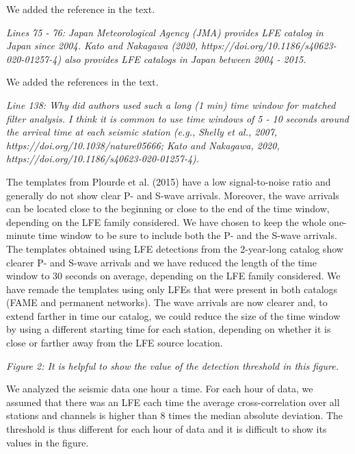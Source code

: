 \documentclass[letterpaper, 12pt]{article}
\begin{document}
\bigskip

We added the reference in the text.

\bigskip

\textit{Lines 75 - 76: Japan Meteorological Agency (JMA) provides LFE catalog in Japan since 2004. Kato and Nakagawa (2020, https://doi.org/10.1186/s40623-020-01257-4) also provides LFE catalogs in Japan between 2004 - 2015.}

\bigskip

We added the references in the text.

\bigskip

\textit{Line 138: Why did authors used such a long (1 min) time window for matched filter analysis. I think it is common to use time windows of 5 - 10 seconds around the arrival time at each seismic station (e.g., Shelly et al., 2007, https://doi.org/10.1038/nature05666; Kato and Nakagawa, 2020, https://doi.org/10.1186/s40623-020-01257-4).}

\bigskip

The templates from Plourde et al. (2015) have a low signal-to-noise ratio and generally do not show clear P- and S-wave arrivals. Moreover, the wave arrivals can be located close to the beginning or close to the end of the time window, depending on the LFE family considered. We have chosen to keep the whole one-minute time window to be sure to include both the P- and the S-wave arrivals. The templates obtained using LFE detections from the 2-year-long catalog show clearer P- and S-wave arrivals and we have reduced the length of the time window to 30 seconds on average, depending on the LFE family considered. We have remade the templates using only LFEs that were present in both catalogs (FAME and permanent networks). The wave arrivals are now clearer and, to extend farther in time our catalog, we could reduce the size of the time window by using a different starting time for each station, depending on whether it is close or farther away from the LFE source location. 

\bigskip

\textit{Figure 2: It is helpful to show the value of the detection threshold in this figure.}

\bigskip

We analyzed the seismic data one hour a time. For each hour of data, we assumed that there was an LFE each time the average cross-correlation over all stations and channels is higher than 8 times the median absolute deviation. The threshold is thus different for each hour of data and it is difficult to show its values in the figure.
\end{document}
